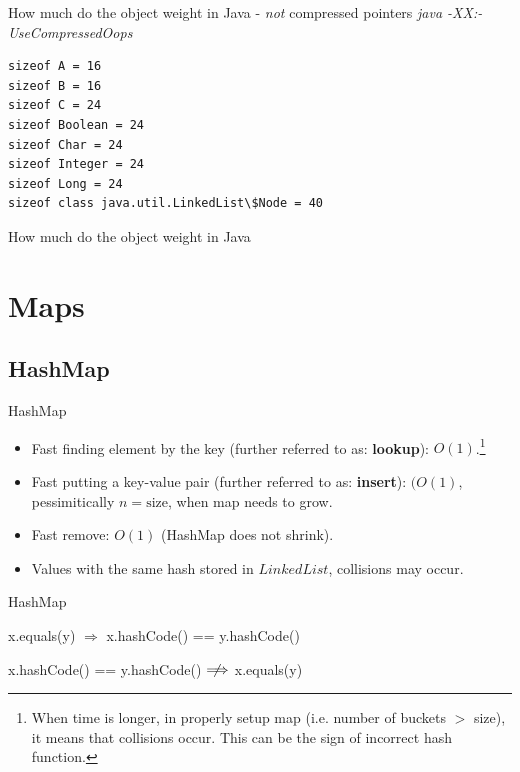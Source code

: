 \documentclass{beamer}
\begin{document}
\begin{frame}[fragile]{How much do the object weight in Java - \textit{not} compressed pointers}
\textit{java -XX:-UseCompressedOops}
\begin{verbatim}
sizeof A = 16
sizeof B = 16
sizeof C = 24
sizeof Boolean = 24
sizeof Char = 24
sizeof Integer = 24
sizeof Long = 24
sizeof class java.util.LinkedList\$Node = 40
\end{verbatim}
\end{frame}

\lstset{style=srcnormal}
\begin{frame}[fragile]{How much do the object weight in Java}
    
\end{frame}

\section{Maps}
\subsection{HashMap}
\begin{frame}{HashMap}

\begin{itemize}
	\item Fast finding element by the key (further referred to as: \textbf{lookup}): $O(1)$.\footnote{When time is longer, in properly setup map (i.e. number of buckets $>$ size), it means that collisions occur. This can be the sign of incorrect hash function.}
    \item Fast putting a key-value pair (further referred to as: \textbf{insert}): $(O(1)$, pessimitically $n=\textrm{size}$, when map needs to grow.
    \item Fast remove: $O(1)$ (HashMap does not shrink).
    \item Values with the same hash stored in $LinkedList$, collisions may occur.
\end{itemize}
\end{frame}

\begin{frame}{HashMap}

\begin{center}x.equals(y) $\Longrightarrow$ x.hashCode() == y.hashCode()\end{center}
\begin{center}x.hashCode() == y.hashCode()  $\centernot\Longrightarrow$ x.equals(y)\end{center}
\end{frame}
\end{document}
